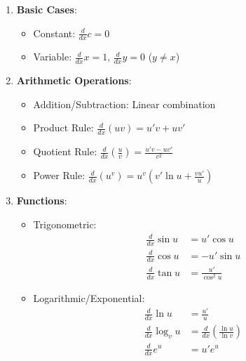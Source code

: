 \documentclass{report}
\begin{document}
\begin{enumerate}
    \item \textbf{Basic Cases}:
    \begin{itemize}
        \item Constant: $\frac{d}{dx}c = 0$
        \item Variable: $\frac{d}{dx}x = 1$, $\frac{d}{dx}y = 0$ ($y \neq x$)
    \end{itemize}

    \item \textbf{Arithmetic Operations}:
    \begin{itemize}
        \item Addition/Subtraction: Linear combination
        \item Product Rule: $\frac{d}{dx}(uv) = u'v + uv'$
        \item Quotient Rule: $\frac{d}{dx}(\frac{u}{v}) = \frac{u'v - uv'}{v^2}$
        \item Power Rule: $\frac{d}{dx}(u^v) = u^v(v'\ln u + \frac{vu'}{u})$
    \end{itemize}

    \item \textbf{Functions}:
    \begin{itemize}
        \item Trigonometric:
        \begin{align*}
            \frac{d}{dx}\sin u &= u'\cos u \\
            \frac{d}{dx}\cos u &= -u'\sin u \\
            \frac{d}{dx}\tan u &= \frac{u'}{\cos^2 u}
        \end{align*}
        \item Logarithmic/Exponential:
        \begin{align*}
            \frac{d}{dx}\ln u &= \frac{u'}{u} \\
            \frac{d}{dx}\log_v u &= \frac{d}{dx}\left(\frac{\ln u}{\ln v}\right) \\
            \frac{d}{dx}e^u &= u'e^u
        \end{align*}
    \end{itemize}
\end{enumerate}
\end{document}
